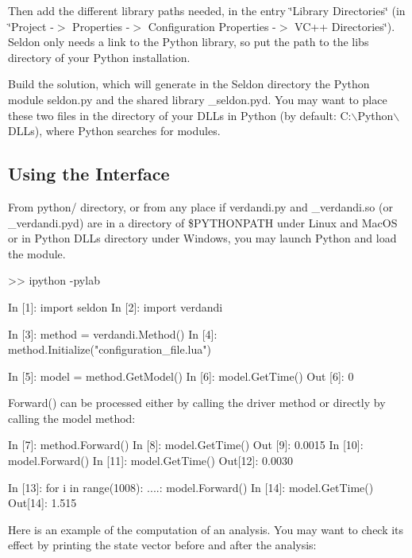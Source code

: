 \documentclass{tufte-book}
\begin{document}
\-Then add the different library paths needed, in the entry \char`\"{}\-Library Directories\char`\"{} (in \char`\"{}\-Project -\/$>$ Properties -\/$>$ Configuration Properties -\/$>$ V\-C++ Directories\char`\"{}). \-Seldon only needs a link to the \-Python library, so put the path to the {\ttfamily libs} directory of your \-Python installation.

\-Build the solution, which will generate in the \-Seldon directory the \-Python module {\ttfamily seldon.\-py} and the shared library {\ttfamily \-\_\-seldon.\-pyd}. \-You may want to place these two files in the directory of your {\ttfamily \-D\-L\-Ls} in \-Python (by default\-: {\ttfamily \-C\-:$\backslash$\-Python$\backslash$\-D\-L\-Ls}), where \-Python searches for modules.\hypertarget{python_using_interface}{}\subsection{\-Using the Interface}\label{python_using_interface}
\-From {\ttfamily python/} directory, or from any place if {\ttfamily verdandi.\-py} and {\ttfamily \-\_\-verdandi.\-so} (or {\ttfamily \-\_\-verdandi.\-pyd}) are in a directory of {\ttfamily \$\-P\-Y\-T\-H\-O\-N\-P\-A\-T\-H} under \-Linux and \-Mac\-O\-S or in \-Python {\ttfamily \-D\-L\-Ls} directory under \-Windows, you may launch \-Python and load the module.

 \begin{frame_python}
>> ipython -pylab

In  [1]: import seldon
In  [2]: import verdandi

In  [3]: method = verdandi.Method()
In  [4]: method.Initialize("configuration_file.lua")

In  [5]: model = method.GetModel()
In  [6]: model.GetTime()
Out [6]: 0
\end{frame_python}


{\ttfamily \-Forward()} can be processed either by calling the driver method or directly by calling the model method\-:

 \begin{frame_python}
In  [7]: method.Forward()
In  [8]: model.GetTime()
Out [9]: 0.0015
In [10]: model.Forward()
In [11]: model.GetTime()
Out[12]: 0.0030

In [13]: for i in range(1008):
   ....:      model.Forward()
In [14]: model.GetTime()
Out[14]: 1.515
\end{frame_python}


\-Here is an example of the computation of an analysis. \-You may want to check its effect by printing the state vector before and after the analysis\-:
\end{document}
